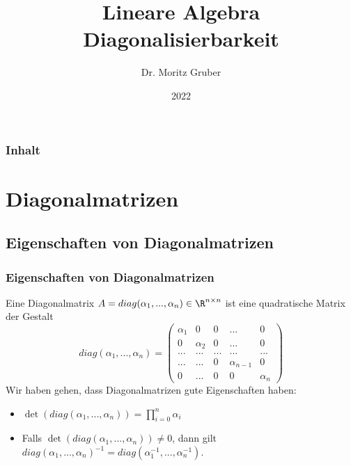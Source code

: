 

\title{Lineare Algebra\\[3mm] 
	\large Diagonalisierbarkeit
}
\author{Dr. Moritz Gruber} 
\date{2022}



%
\begin{frame}[plain] 
 \titlepage
\end{frame}
%
%
\begin{frame}\frametitle{Inhalt}
   \tableofcontents
\end{frame}
%
\section{Diagonalmatrizen}
\subsection{Eigenschaften von Diagonalmatrizen}
%
\begin{frame}\frametitle{Eigenschaften von Diagonalmatrizen}

 Eine Diagonalmatrix $A=diag(\alpha_1,...,\alpha_n) \in \R^{n\times n}$ ist eine quadratische Matrix der Gestalt
$$
diag(\alpha_1,...,\alpha_n)=\begin{pmatrix} \alpha_1 & 0& 0&... & 0 \\0 & \alpha_2 & 0 & ... & 0 \\ ...&...&...&...&... \\ ...&...&0&\alpha_{n-1}&0 \\ 0 & ... &0 & 0 & \alpha_n \end{pmatrix}
$$\pause
Wir haben gehen, dass Diagonalmatrizen gute Eigenschaften haben:\pause
\begin{itemize}
\item $\det(diag(\alpha_1,...,\alpha_n))= \prod_{i=0}^n \alpha_i$ \pause
\item Falls $\det(diag(\alpha_1,...,\alpha_n)) \ne 0$, dann gilt $diag(\alpha_1,...,\alpha_n)^{-1}=diag(\alpha_1^{-1},...,\alpha_n^{-1})$.
\end{itemize}
	
\end{frame}
%
%
